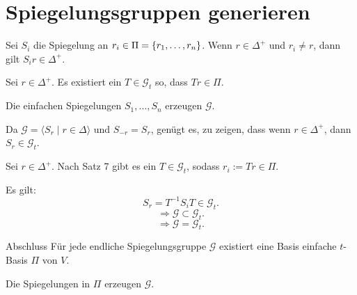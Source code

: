 \documentclass[18pt,handout]{beamer}
\begin{document}
\section{Spiegelungsgruppen generieren}
\begin{frame}
    \begin{satz} %
        Sei \( S_i \) die Spiegelung an 
        \( r_i \in \Pi = \{r_1, \ldots, r_n\} \).
        Wenn \( r \in \Delta^+ \) und \( r_i \neq r \), 
        dann gilt \( S_i r \in \Delta^+ \).
    \end{satz}
    \pause
\end{frame}

\begin{frame}
    \begin{satz} %
        Sei \( r \in \Delta^+ \). Es existiert ein \( T \in 
        \mathscr{G}_t \) so, dass 
        \( Tr \in \Pi \).
    \end{satz}
\end{frame}

\begin{frame}
    \begin{satz} %
        Die einfachen Spiegelungen \( S_1, \ldots, S_n \) 
        erzeugen \( \mathscr{G} \).
    \end{satz}
    \pause
    \begin{bew}
        Da \( \mathscr{G} = \langle S_r \;\vert\; r \in \Delta \rangle \) 
        und \( S_{-r} = S_r \), genügt es, zu zeigen, dass wenn 
        \( r\in \Delta^+ \), dann \( S_r \in \mathscr{G}_t \).

        \pause
        Sei \( r \in \Delta^+ \). Nach Satz 7 gibt es 
        ein \( T \in \mathscr{G}_t \), sodass 
        \( r_i := Tr \in \Pi \).

        \pause
        Es gilt:
        \[ S_r = T^{-1} S_i T \in \mathscr{G}_t. \]
        \[ \Rightarrow \mathscr{G} \subset \mathscr{G}_t. \]
        \[ \Rightarrow \mathscr{G} = \mathscr{G}_t. \]
    \end{bew}
\end{frame}

\begin{frame}{Abschluss}
    Für jede endliche Spiegelungsgruppe 
    \( \mathscr{G} \) existiert eine Basis 
    einfache \( t \)-Basis \( \Pi \) 
    von \( V \). 
    \pause
    
    Die Spiegelungen in 
    \( \Pi \) erzeugen \( \mathscr{G} \).
\end{frame}
\end{document}
